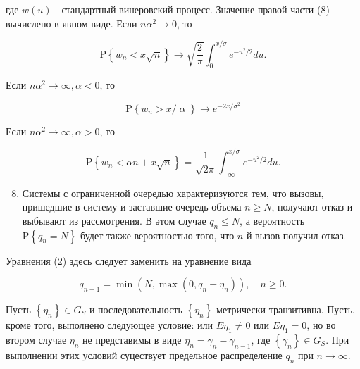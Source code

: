 \documentclass[10pt]{article}
\begin{document}
где $w(u)$ - стандартный винеровский процесс. Значение правой части (8) вычислено в явном виде. Если $n \alpha^{2} \rightarrow 0$, то



\[

\mathrm{P}\left\{w_{n}<x \sqrt{n}\right\} \rightarrow \sqrt{\frac{2}{\pi}} \int_{0}^{x / \sigma} e^{-u^{2} / 2} d u .

\]



Если $n \alpha^{2} \rightarrow \infty, \alpha<0$, то



\[

\mathrm{P}\left\{w_{n}>x /|\alpha|\right\} \rightarrow e^{-2 x / \sigma^{2}}

\]



Если $n \alpha^{2} \rightarrow \infty, \alpha>0$, то



\[

\mathrm{P}\left\{w_{n}<\alpha n+x \sqrt{n}\right\}=\frac{1}{\sqrt{2 \pi}} \int_{-\infty}^{x / \sigma} e^{-u^{2} / 2} d u .

\]



\begin{enumerate}

  \setcounter{enumi}{7}

  \item Системы с ограниченной очередью характеризуются тем, что вызовы, пришедшие в систему и заставшие очередь объема $n \geqslant N$, получают отказ и выбывают из рассмотрения. В әтом случае $q_{n} \leqslant N$, а вероятность $\mathrm{P}\left\{q_{n}=N\right\}$ будет также вероятностью того, что $n$-й вызов получил отказ.

\end{enumerate}



Уравнения (2) здесь следует заменить на уравнение вида



\[

q_{n+1}=\min \left(N, \max \left(0, q_{n}+\eta_{n}\right)\right), \quad n \geqslant 0 .

\]



Пусть $\left\{\eta_{n}\right\} \in G_{S}$ и последовательность $\left\{\eta_{n}\right\}$ метрически транзитивна. Пусть, кроме того, выполнено следующее условие: или $E \eta_{1} \neq 0$ или $E \eta_{1}=0$, но во втором случае $\eta_{n}$ не представимы в виде $\eta_{n}=\gamma_{n}-\gamma_{n-1}$, где $\left\{\gamma_{n}\right\} \in G_{S}$. При выполнении этих условий суцествует предельное распределение $q_{n}$ при $n \rightarrow \infty$.
\end{document}
